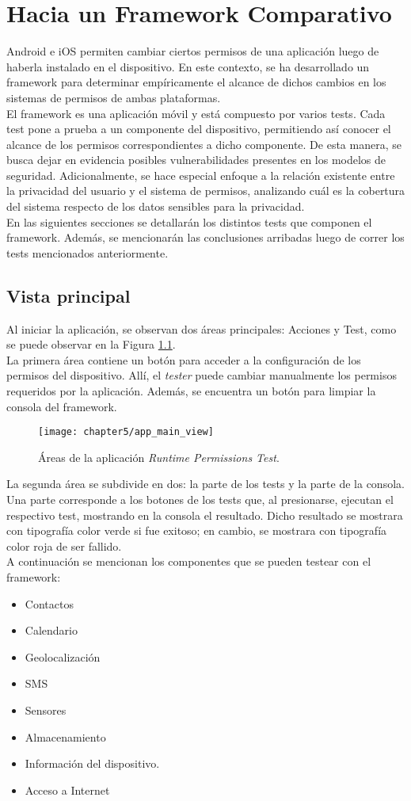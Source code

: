 \chapter{Hacia un Framework Comparativo}
Android e iOS permiten cambiar ciertos permisos de una aplicación luego de haberla instalado en el dispositivo. En este contexto, se ha desarrollado un framework para determinar empíricamente el alcance de dichos cambios en los sistemas de permisos de ambas plataformas.\\
El framework es una aplicación móvil y está compuesto por varios tests. Cada test pone a prueba a un componente del dispositivo, permitiendo así conocer el alcance de los permisos correspondientes a dicho componente. De esta manera, se busca dejar en evidencia posibles vulnerabilidades presentes en los modelos de seguridad. Adicionalmente, se hace especial enfoque a la relación existente entre la privacidad del usuario y el sistema de permisos, analizando cuál es la cobertura del sistema respecto de los datos sensibles para la privacidad.\\
En las siguientes secciones se detallarán los distintos tests que componen el framework. Además, se mencionarán las conclusiones arribadas luego de correr los tests mencionados anteriormente.
\section{Vista principal} \label{sec:main-view}
Al iniciar la aplicación, se observan dos áreas principales: Acciones y Test, como se puede observar en la Figura \ref{fig:chapter05:main_view}.\\
La primera área contiene un botón para acceder a la configuración de los permisos del dispositivo. Allí, el \textit{tester} puede cambiar manualmente los permisos requeridos por la aplicación. Además, se encuentra un botón para limpiar la consola del framework.\\
\begin{figure}[hbtp]
    \centering
	\texttt{[image: chapter5/app\_main\_view]}
	\caption{Áreas de la aplicación \textit{Runtime Permissions Test}.}
	\label{fig:chapter05:main_view}
\end{figure}
La segunda área se subdivide en dos: la parte de los tests y la parte de la consola. Una parte corresponde a los botones de los tests que, al presionarse, ejecutan el respectivo test, mostrando en la consola el resultado. Dicho resultado se mostrara con tipografía color verde si fue exitoso; en cambio, se mostrara con tipografía color roja de ser fallido.\\
A continuación se mencionan los componentes que se pueden testear con el framework:
\begin{itemize}
	\item Contactos
	\item Calendario
	\item Geolocalización
	\item SMS
	\item Sensores
	\item Almacenamiento
	\item Información del dispositivo.
	\item Acceso a Internet
\end{itemize}
